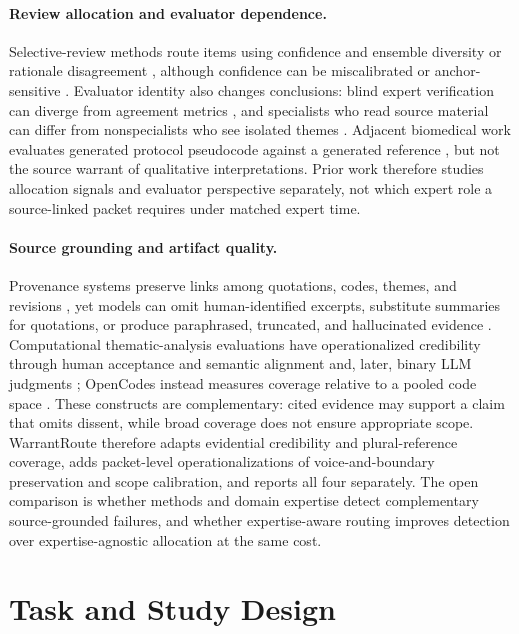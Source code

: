 \paragraph{Review allocation and evaluator dependence.}
Selective-review methods route items using confidence and ensemble diversity \citep{zhao2025confidence} or rationale disagreement \citep{tajik2026disagreement}, although confidence can be miscalibrated or anchor-sensitive \citep{li2026confidence}. Evaluator identity also changes conclusions: blind expert verification can diverge from agreement metrics \citep{liu2026agreement}, and specialists who read source material can differ from nonspecialists who see isolated themes \citep{moskalewicz2026phenomenology}. Adjacent biomedical work evaluates generated protocol pseudocode against a generated reference \citep{yi2024protomed}, but not the source warrant of qualitative interpretations. Prior work therefore studies allocation signals and evaluator perspective separately, not which expert role a source-linked packet requires under matched expert time.

\paragraph{Source grounding and artifact quality.}
Provenance systems preserve links among quotations, codes, themes, and revisions \citep{ye2026reflexis,yi2026provenance}, yet models can omit human-identified excerpts, substitute summaries for quotations, or produce paraphrased, truncated, and hallucinated evidence \citep{parkington2025human,bang2026hybrid}. Computational thematic-analysis evaluations have operationalized credibility through human acceptance and semantic alignment and, later, binary LLM judgments \citep{qiao2025thematiclm,wang2026centaurta}; OpenCodes instead measures coverage relative to a pooled code space \citep{chen2026opencodes}. These constructs are complementary: cited evidence may support a claim that omits dissent, while broad coverage does not ensure appropriate scope. WarrantRoute therefore adapts evidential credibility and plural-reference coverage, adds packet-level operationalizations of voice-and-boundary preservation and scope calibration, and reports all four separately. The open comparison is whether methods and domain expertise detect complementary source-grounded failures, and whether expertise-aware routing improves detection over expertise-agnostic allocation at the same cost.

\section{Task and Study Design}

